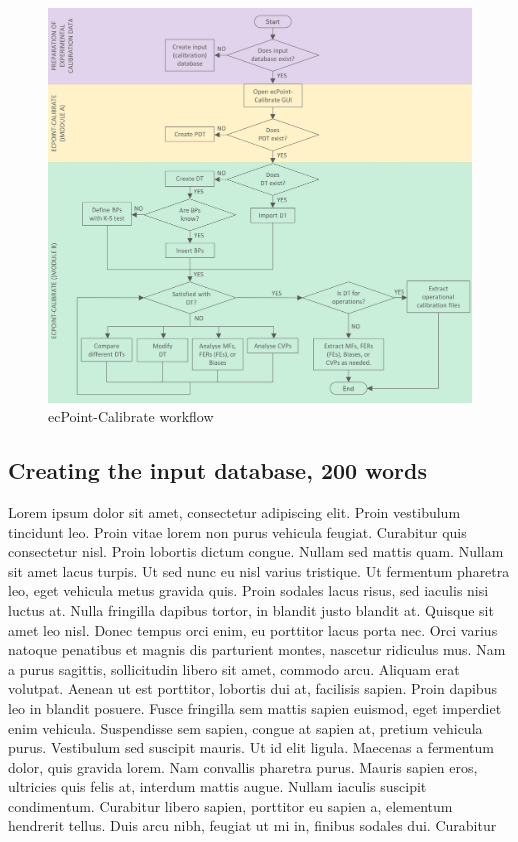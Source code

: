 \documentclass[techmemo]{ecmwfrep}%
\begin{document}
\begin{figure}
\includegraphics{Figures/Flowchart_ecPointCalibrate_Workflow.png}
\caption{ecPoint-Calibrate workflow}
\label{Flowchart_ecPointCalibrate_Workflow}
\end{figure}

\subsection{Creating the input database, 200 words}

Lorem ipsum dolor sit amet, consectetur adipiscing elit. Proin vestibulum tincidunt leo. Proin vitae lorem non purus vehicula feugiat. Curabitur quis consectetur nisl. Proin lobortis dictum congue. Nullam sed mattis quam. Nullam sit amet lacus turpis. Ut sed nunc eu nisl varius tristique. Ut fermentum pharetra leo, eget vehicula metus gravida quis. Proin sodales lacus risus, sed iaculis nisi luctus at. Nulla fringilla dapibus tortor, in blandit justo blandit at. Quisque sit amet leo nisl. Donec tempus orci enim, eu porttitor lacus porta nec. Orci varius natoque penatibus et magnis dis parturient montes, nascetur ridiculus mus. Nam a purus sagittis, sollicitudin libero sit amet, commodo arcu. Aliquam erat volutpat. Aenean ut est porttitor, lobortis dui at, facilisis sapien. Proin dapibus leo in blandit posuere. Fusce fringilla sem mattis sapien euismod, eget imperdiet enim vehicula. Suspendisse sem sapien, congue at sapien at, pretium vehicula purus. Vestibulum sed suscipit mauris. Ut id elit ligula. Maecenas a fermentum dolor, quis gravida lorem. Nam convallis pharetra purus. Mauris sapien eros, ultricies quis felis at, interdum mattis augue. Nullam iaculis suscipit condimentum. Curabitur libero sapien, porttitor eu sapien a, elementum hendrerit tellus. Duis arcu nibh, feugiat ut mi in, finibus sodales dui. Curabitur 
\end{document}
